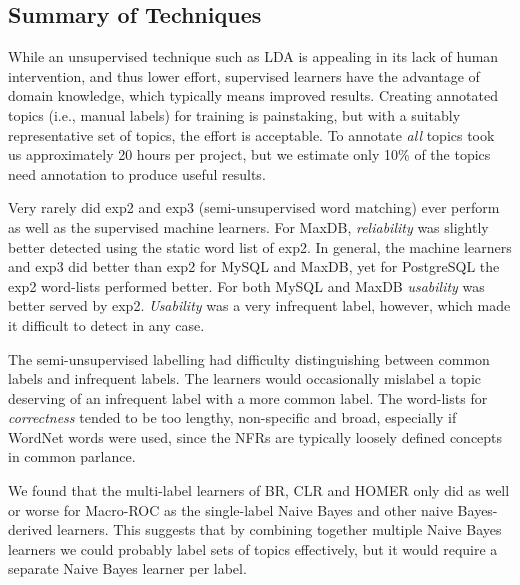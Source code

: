 \documentclass[smallextended]{svjour3}       %
\begin{document}




\subsection{Summary of Techniques}
While an unsupervised technique such as LDA is appealing in its lack of human intervention, and thus lower effort, 
supervised learners have the advantage of domain knowledge, which typically means improved results. 
Creating annotated topics (i.e., manual labels) for training is painstaking, but with a suitably representative set of topics, the effort is acceptable. To
annotate \emph{all} topics took us approximately 20 hours per project, but we estimate only 10\% of the topics need annotation to produce useful results.

Very rarely did \textsf{exp2} and \textsf{exp3} (semi-unsupervised word matching) ever perform as well as the supervised machine learners. 
For MaxDB, \textit{reliability} was slightly better detected using the static word list of \textsf{exp2}. 
In general, the machine learners and \textsf{exp3} did better than
\textsf{exp2} for MySQL and MaxDB, yet for PostgreSQL the
\textsf{exp2} word-lists performed better.
For both MySQL and MaxDB \textit{usability} was better served by \textsf{exp2}. 
\textit{Usability} was a very infrequent label, however, which made it difficult to detect in any case.

The semi-unsupervised labelling had difficulty distinguishing between common labels and infrequent labels. 
The learners would occasionally mislabel a topic deserving of an infrequent label with a more common label.
The word-lists for \emph{correctness} tended to be too lengthy, non-specific and broad, especially if WordNet words were used, since the NFRs are
typically loosely defined concepts in common parlance.

We found that the multi-label learners of BR, CLR and HOMER only did
as well or worse for Macro-ROC as the single-label Naive Bayes and other naive Bayes-derived learners. 
This suggests that by combining together multiple Naive Bayes learners
we could probably label sets of topics effectively, but it would
require a separate Naive Bayes learner per label.
\end{document}
